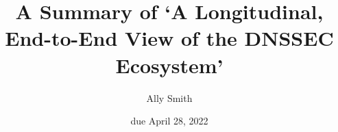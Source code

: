 \documentclass[12pt]{article}
\title{\bf A Summary of `A Longitudinal, End-to-End View of
the DNSSEC Ecosystem'}
\author{Ally Smith}
\date{due April 28, 2022}
\begin{document}
\maketitle{}
\end{document}
